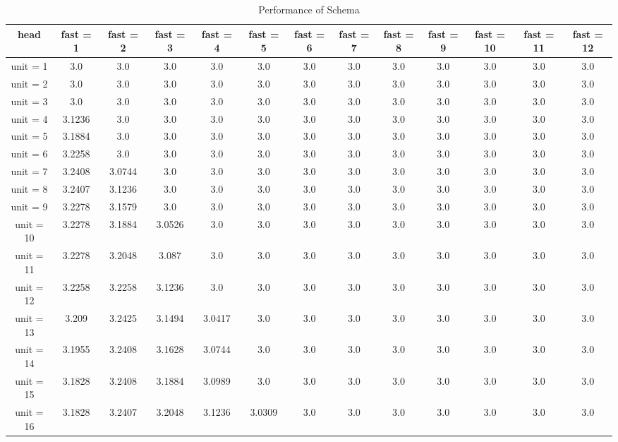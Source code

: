 \begin{table*}[ht]
\tabcolsep=0.11cm
\tiny
\caption{Performance of Schema} 
\label{performance-table}
\begin{tabular}{|c|c|c|c|c|c|c|c|c|c|c|c|c|}
\hline
head &  fast = 1 & fast = 2 & fast = 3 & fast = 4 & fast = 5 & fast = 6 & fast = 7 & fast = 8 & fast = 9 & fast = 10 & fast = 11 & fast = 12 \\ \hline
unit = 1 &
3.0 & 3.0 & 3.0 & 3.0 & 3.0 & 3.0 & 3.0 & 3.0 & 3.0 & 3.0 & 3.0 & 3.0 \\
\hline
unit = 2 &
3.0 & 3.0 & 3.0 & 3.0 & 3.0 & 3.0 & 3.0 & 3.0 & 3.0 & 3.0 & 3.0 & 3.0 \\
\hline
unit = 3 &
3.0 & 3.0 & 3.0 & 3.0 & 3.0 & 3.0 & 3.0 & 3.0 & 3.0 & 3.0 & 3.0 & 3.0 \\
\hline
unit = 4 &
3.1236 & 3.0 & 3.0 & 3.0 & 3.0 & 3.0 & 3.0 & 3.0 & 3.0 & 3.0 & 3.0 & 3.0 \\
\hline
unit = 5 &
3.1884 & 3.0 & 3.0 & 3.0 & 3.0 & 3.0 & 3.0 & 3.0 & 3.0 & 3.0 & 3.0 & 3.0 \\
\hline
unit = 6 &
3.2258 & 3.0 & 3.0 & 3.0 & 3.0 & 3.0 & 3.0 & 3.0 & 3.0 & 3.0 & 3.0 & 3.0 \\
\hline
unit = 7 &
3.2408 & 3.0744 & 3.0 & 3.0 & 3.0 & 3.0 & 3.0 & 3.0 & 3.0 & 3.0 & 3.0 & 3.0 \\
\hline
unit = 8 &
3.2407 & 3.1236 & 3.0 & 3.0 & 3.0 & 3.0 & 3.0 & 3.0 & 3.0 & 3.0 & 3.0 & 3.0 \\
\hline
unit = 9 &
3.2278 & 3.1579 & 3.0 & 3.0 & 3.0 & 3.0 & 3.0 & 3.0 & 3.0 & 3.0 & 3.0 & 3.0 \\
\hline
unit = 10 &
3.2278 & 3.1884 & 3.0526 & 3.0 & 3.0 & 3.0 & 3.0 & 3.0 & 3.0 & 3.0 & 3.0 & 3.0 \\
\hline
unit = 11 &
3.2278 & 3.2048 & 3.087 & 3.0 & 3.0 & 3.0 & 3.0 & 3.0 & 3.0 & 3.0 & 3.0 & 3.0 \\
\hline
unit = 12 &
3.2258 & 3.2258 & 3.1236 & 3.0 & 3.0 & 3.0 & 3.0 & 3.0 & 3.0 & 3.0 & 3.0 & 3.0 \\
\hline
unit = 13 &
3.209 & 3.2425 & 3.1494 & 3.0417 & 3.0 & 3.0 & 3.0 & 3.0 & 3.0 & 3.0 & 3.0 & 3.0 \\
\hline
unit = 14 &
3.1955 & 3.2408 & 3.1628 & 3.0744 & 3.0 & 3.0 & 3.0 & 3.0 & 3.0 & 3.0 & 3.0 & 3.0 \\
\hline
unit = 15 &
3.1828 & 3.2408 & 3.1884 & 3.0989 & 3.0 & 3.0 & 3.0 & 3.0 & 3.0 & 3.0 & 3.0 & 3.0 \\
\hline
unit = 16 &
3.1828 & 3.2407 & 3.2048 & 3.1236 & 3.0309 & 3.0 & 3.0 & 3.0 & 3.0 & 3.0 & 3.0 & 3.0 \\

\end{tabular}
\end{table*}
